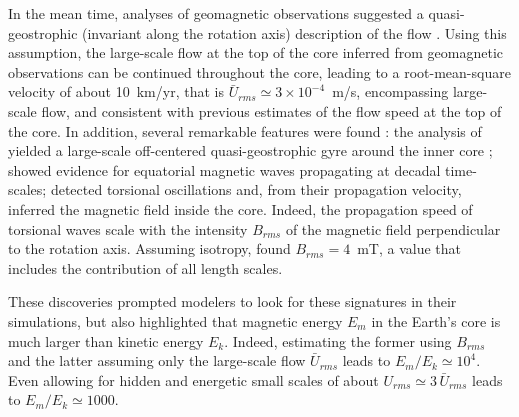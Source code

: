 \documentclass[12pt, a4paper]{article}
\begin{document}
In the mean time, analyses of geomagnetic observations suggested a quasi-geostrophic (invariant along the rotation axis) description of the flow \citep{gillet2011}.
Using this assumption, the large-scale flow at the top of the core inferred from geomagnetic observations can be continued throughout the core, leading to a root-mean-square velocity of about 10~km/yr, that is $\bar{U}_{rms} \simeq 3 \times 10^{-4}$~m/s, encompassing large-scale flow, and consistent with previous estimates of the flow speed at the top of the core.
In addition, several remarkable features were found \citep{pais2015,gillet2015}:
the analysis of \citet{pais2008} yielded a large-scale off-centered quasi-geostrophic gyre around the inner core \citep[also see:][]{schaeffer2011};
\citet{finlay2003} showed evidence for equatorial magnetic waves propagating at decadal time-scales;
\citet{gillet2010} detected torsional oscillations and, from their propagation velocity, inferred the magnetic field inside the core.
Indeed, the propagation speed of torsional waves scale with the intensity $B_{rms}$ of the magnetic field perpendicular to the rotation axis.
Assuming isotropy, \citet{gillet2010,gillet2015} found $B_{rms} = 4$~mT, a value that includes the contribution of all length scales.

These discoveries prompted modelers to look for these signatures in their simulations, but also highlighted that magnetic energy $E_m$ in the Earth's core is much larger than kinetic energy $E_k$.
Indeed, estimating the former using $B_{rms}$ and the latter assuming only the large-scale flow $\bar{U}_{rms}$ leads to $E_m/E_k \simeq 10^4$.
Even allowing for hidden and energetic small scales of about $U_{rms} \simeq 3\,\bar{U}_{rms}$ leads to $E_m/E_k \simeq 1000$.
\end{document}
